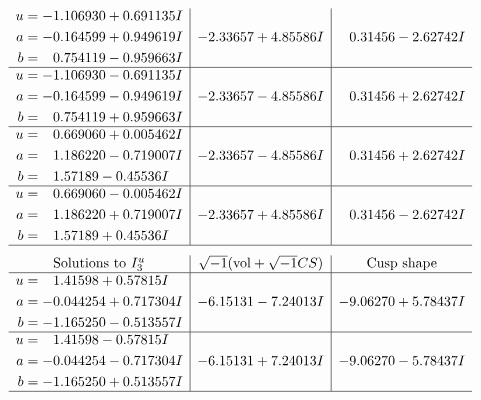\documentclass[1p]{elsarticle_modified}
\theoremstyle{definition}
\newcommand{\I}{\sqrt{-1}}
\begin{document}
$$\begin{array}{c|c|c}
\begin{aligned}
u &= -1.106930 + 0.691135 I \\
a &= -0.164599 + 0.949619 I \\
b &= \phantom{-}0.754119 - 0.959663 I\end{aligned}
 & -2.33657 + 4.85586 I & \phantom{-}0.31456 - 2.62742 I \\ \hline\begin{aligned}
u &= -1.106930 - 0.691135 I \\
a &= -0.164599 - 0.949619 I \\
b &= \phantom{-}0.754119 + 0.959663 I\end{aligned}
 & -2.33657 - 4.85586 I & \phantom{-}0.31456 + 2.62742 I \\ \hline\begin{aligned}
u &= \phantom{-}0.669060 + 0.005462 I \\
a &= \phantom{-}1.186220 - 0.719007 I \\
b &= \phantom{-}1.57189 - 0.45536 I\end{aligned}
 & -2.33657 - 4.85586 I & \phantom{-}0.31456 + 2.62742 I \\ \hline\begin{aligned}
u &= \phantom{-}0.669060 - 0.005462 I \\
a &= \phantom{-}1.186220 + 0.719007 I \\
b &= \phantom{-}1.57189 + 0.45536 I\end{aligned}
 & -2.33657 + 4.85586 I & \phantom{-}0.31456 - 2.62742 I\\
 \hline 
 \end{array}$$\newpage$$\begin{array}{c|c|c}  
\text{Solutions to }I^u_{3}& \I (\text{vol} + \sqrt{-1}CS) & \text{Cusp shape}\\
 \hline 
\begin{aligned}
u &= \phantom{-}1.41598 + 0.57815 I \\
a &= -0.044254 + 0.717304 I \\
b &= -1.165250 - 0.513557 I\end{aligned}
 & -6.15131 - 7.24013 I & -9.06270 + 5.78437 I \\ \hline\begin{aligned}
u &= \phantom{-}1.41598 - 0.57815 I \\
a &= -0.044254 - 0.717304 I \\
b &= -1.165250 + 0.513557 I\end{aligned}
 & -6.15131 + 7.24013 I & -9.06270 - 5.78437 I\\
 \hline 
 \end{array}$$\newpage\newpage\renewcommand{\arraystretch}{1}
\end{document}
